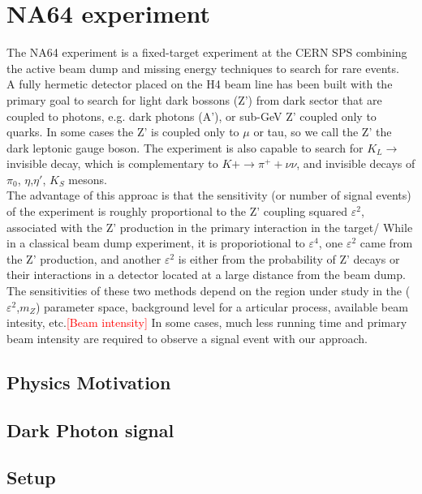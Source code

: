 \section{NA64 experiment}
The NA64 experiment is a fixed-target experiment at the CERN SPS combining the active beam dump and missing energy techniques to search for rare events.\\
A fully hermetic detector placed on the H4 beam line has been built with the primary goal to search for light dark bossons (Z') from dark sector that are coupled to photons, e.g. dark photons (A'), or sub-GeV Z' coupled only to quarks. In some cases the Z' is coupled only to $\mu$ or tau, so we call the Z' the dark leptonic gauge boson. The experiment is also capable to search for $K_L \rightarrow $invisible decay, which is complementary to $K+\rightarrow \pi^+ + \nu \nu$, and invisible decays of $\pi_0$, $\eta$,$\eta'$, $K_S$ mesons.\\
The advantage of this approac is that the sensitivity (or number of signal events) of the experiment is roughly proportional to the Z' coupling squared $\varepsilon^2$, associated with the Z' production in the primary interaction in the target/ While in a classical beam dump experiment, it is proporiotional to $\varepsilon^4$, one $\varepsilon^2$ came from the Z' production, and another $\varepsilon^2$ is either from the probability of Z' decays or their interactions in a detector located at a large distance from the beam dump.\\ 
The sensitivities of these two methods depend on the region under study in the ($\varepsilon^2$,$m_Z$) parameter space, background level for a articular process, available beam intesity, etc.\textcolor{red}{[Beam intensity]} In some cases, much less running time and primary beam intensity are required to observe a signal event with our approach.\\


\subsection{Physics Motivation}



\subsection{Dark Photon signal}



\subsection{Setup}
